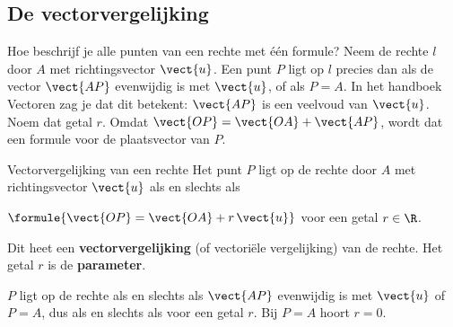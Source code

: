 
\begin{oefeningen}
\end{oefeningen}

\subsection{De vectorvergelijking}

Hoe beschrijf je alle punten van een rechte met één formule? Neem de rechte $l$ door $A$ met richtingsvector $\vect{u}$. Een punt $P$ ligt op $l$ precies dan als de vector $\vect{AP}$ evenwijdig is met $\vect{u}$, of als $P = A$. In het handboek Vectoren zag je dat dit betekent: $\vect{AP}$ is een veelvoud van $\vect{u}$. Noem dat getal $r$. Omdat $\vect{OP} = \vect{OA} + \vect{AP}$, wordt dat een formule voor de plaatsvector van $P$.

\begin{theorie}
\begin{stelling}{Vectorvergelijking van een rechte}
Het punt $P$ ligt op de rechte door $A$ met richtingsvector $\vect{u}$ als en slechts als

\vspace{1mm}
\qquad $\formule{\vect{OP} = \vect{OA} + r\,\vect{u}}$ \quad voor een getal $r \in \R$.

\vspace{1mm}
Dit heet een \textbf{\textcolor{accent}{vectorvergelijking}} (of vectoriële vergelijking) van de rechte. Het getal $r$ is de \textbf{\textcolor{accent}{parameter}}.
\end{stelling}
\begin{bewijs}
$P$ ligt op de rechte als en slechts als $\vect{AP}$ evenwijdig is met $\vect{u}$ of $P = A$, dus als en slechts als
voor een getal $r$. Bij $P = A$ hoort $r = 0$.
\end{bewijs}
\end{theorie}

